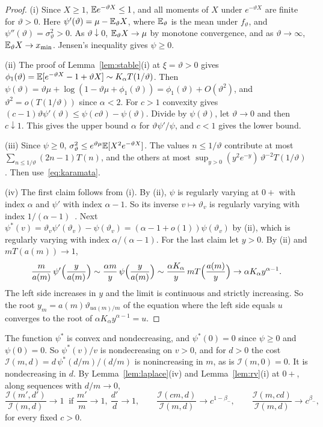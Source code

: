 \begin{proof}
(i) Since $X\ge1$, $\mathbb{E} e^{-\vartheta X}\le1$, and all moments of $X$ under $e^{-\vartheta X}$
are finite for $\vartheta>0$. Here $\psi'(\vartheta)=\mu-\mathbb{E}_\vartheta X$, where $\mathbb{E}_\vartheta$
is the mean under $f_\vartheta$, and $\psi''(\vartheta)=\sigma^2_\vartheta>0$. As
$\vartheta\downarrow0$, $\mathbb{E}_\vartheta X\to\mu$ by monotone convergence, and as
$\vartheta\to\infty$, $\mathbb{E}_\vartheta X\to x_{\min}$. Jensen's inequality gives $\psi\ge0$.

(ii) The proof of Lemma~\ref{lem:stable}(i) at $\xi=\vartheta>0$ gives
$\phi_1(\vartheta)=\mathbb{E}[e^{-\vartheta X}-1+\vartheta X]\sim K_\alpha T(1/\vartheta)$. Then
$\psi(\vartheta)=\vartheta\mu+\log(1-\vartheta\mu+\phi_1(\vartheta))=\phi_1(\vartheta)+O(\vartheta^2)$,
and $\vartheta^2=o(T(1/\vartheta))$ since $\alpha<2$. For $c>1$ convexity gives
$(c-1)\vartheta\psi'(\vartheta)\le\psi(c\vartheta)-\psi(\vartheta)$. Divide by $\psi(\vartheta)$,
let $\vartheta\to0$ and then $c\downarrow1$. This gives the upper bound $\alpha$ for
$\vartheta\psi'/\psi$, and $c<1$ gives the lower bound.

(iii) Since $\psi\ge0$, $\sigma^2_\vartheta\le e^{\vartheta\mu}\mathbb{E}[X^2e^{-\vartheta X}]$. The
values $n\le1/\vartheta$ contribute at most $\sum_{n\le1/\vartheta}(2n-1)T(n)$, and the others
at most $\sup_{y>0}(y^2e^{-y})\,\vartheta^{-2}T(1/\vartheta)$. Then use~\eqref{eq:karamata}.

(iv) The first claim follows from (i). By (ii), $\psi$ is regularly varying at $0+$ with
index $\alpha$ and $\psi'$ with index $\alpha-1$. So its inverse $v\mapsto\vartheta_v$ is
regularly varying with index $1/(\alpha-1)$~\cite[Theorem~1.5.12]{bgt1989}. Next
$\psi^*(v)=\vartheta_v\psi'(\vartheta_v)-\psi(\vartheta_v)=(\alpha-1+o(1))\psi(\vartheta_v)$ by
(ii), which is regularly varying with index $\alpha/(\alpha-1)$. For the last claim let
$y>0$. By (ii) and $mT(a(m))\to1$,
\[
 \frac m{a(m)}\,\psi'\Bigl(\frac y{a(m)}\Bigr)\sim\frac{\alpha m}{y}\,\psi\Bigl(\frac y{a(m)}\Bigr)
 \sim\frac{\alpha K_\alpha}{y}\,mT\Bigl(\frac{a(m)}y\Bigr)\to\alpha K_\alpha y^{\alpha-1}.
\]
The left side increases in $y$ and the limit is continuous and strictly increasing. So the
root $y_m=a(m)\vartheta_{ua(m)/m}$ of the equation where the left side equals $u$ converges
to the root of $\alpha K_\alpha y^{\alpha-1}=u$.
\end{proof}

The function $\psi^*$ is convex and nondecreasing, and $\psi^*(0)=0$ since $\psi\ge0$ and
$\psi(0)=0$. So $\psi^*(v)/v$ is nondecreasing on $v>0$, and for $d>0$ the cost
$\mathcal I(m,d)=d\,\psi^*(d/m)/(d/m)$ is nonincreasing in $m$, as is $\mathcal I(m,0)=0$. It is nondecreasing in $d$. By Lemma~\ref{lem:laplace}(iv) and Lemma~\ref{lem:rv}(i) at $0+$, along
sequences with $d/m\to0$,
\begin{equation}\label{eq:I-scaling}
 \frac{\mathcal I(m',d')}{\mathcal I(m,d)}\to1\ \text{ if }\frac{m'}m\to1,\ \frac{d'}d\to1,
 \qquad
 \frac{\mathcal I(cm,d)}{\mathcal I(m,d)}\to c^{1-\beta_\minus},\qquad
 \frac{\mathcal I(m,cd)}{\mathcal I(m,d)}\to c^{\beta_\minus},
\end{equation}
for every fixed $c>0$.

